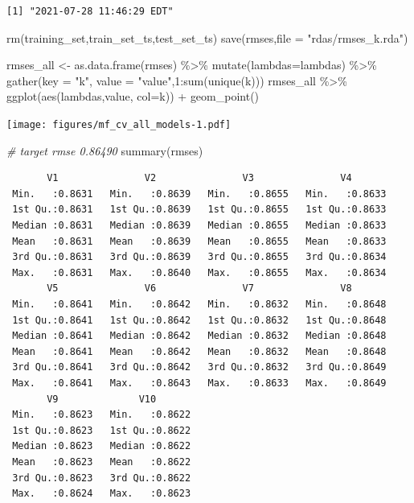 \documentclass[
]{article}
\newenvironment{Shaded}{}{}
\newcommand{\AttributeTok}[1]{\textcolor[rgb]{0.49,0.56,0.16}{#1}}
\newcommand{\CommentTok}[1]{\textcolor[rgb]{0.38,0.63,0.69}{\textit{#1}}}
\newcommand{\DecValTok}[1]{\textcolor[rgb]{0.25,0.63,0.44}{#1}}
\newcommand{\FunctionTok}[1]{\textcolor[rgb]{0.02,0.16,0.49}{#1}}
\newcommand{\NormalTok}[1]{#1}
\newcommand{\OtherTok}[1]{\textcolor[rgb]{0.00,0.44,0.13}{#1}}
\newcommand{\SpecialCharTok}[1]{\textcolor[rgb]{0.25,0.44,0.63}{#1}}
\newcommand{\StringTok}[1]{\textcolor[rgb]{0.25,0.44,0.63}{#1}}
\begin{document}
\begin{verbatim}
[1] "2021-07-28 11:46:29 EDT"
\end{verbatim}

\begin{Shaded}
\begin{Highlighting}[]
\FunctionTok{rm}\NormalTok{(training\_set,train\_set\_ts,test\_set\_ts)}
\FunctionTok{save}\NormalTok{(rmses,}\AttributeTok{file =} \StringTok{"rdas/rmses\_k.rda"}\NormalTok{)}

\NormalTok{rmses\_all }\OtherTok{\textless{}{-}} \FunctionTok{as.data.frame}\NormalTok{(rmses) }\SpecialCharTok{\%\textgreater{}\%} 
  \FunctionTok{mutate}\NormalTok{(}\AttributeTok{lambdas=}\NormalTok{lambdas) }\SpecialCharTok{\%\textgreater{}\%} 
  \FunctionTok{gather}\NormalTok{(}\AttributeTok{key =} \StringTok{"k"}\NormalTok{, }\AttributeTok{value =} \StringTok{"value"}\NormalTok{,}\DecValTok{1}\SpecialCharTok{:}\FunctionTok{sum}\NormalTok{(}\FunctionTok{unique}\NormalTok{(k))) }
\NormalTok{rmses\_all }\SpecialCharTok{\%\textgreater{}\%} 
  \FunctionTok{ggplot}\NormalTok{(}\FunctionTok{aes}\NormalTok{(lambdas,value, }\AttributeTok{col=}\NormalTok{k)) }\SpecialCharTok{+} 
  \FunctionTok{geom\_point}\NormalTok{()}
\end{Highlighting}
\end{Shaded}

\texttt{[image: figures/mf\_cv\_all\_models-1.pdf]}

\begin{Shaded}
\begin{Highlighting}[]
\CommentTok{\# target rmse 0.86490}
\FunctionTok{summary}\NormalTok{(rmses)}
\end{Highlighting}
\end{Shaded}

\begin{verbatim}
       V1               V2               V3               V4        
 Min.   :0.8631   Min.   :0.8639   Min.   :0.8655   Min.   :0.8633  
 1st Qu.:0.8631   1st Qu.:0.8639   1st Qu.:0.8655   1st Qu.:0.8633  
 Median :0.8631   Median :0.8639   Median :0.8655   Median :0.8633  
 Mean   :0.8631   Mean   :0.8639   Mean   :0.8655   Mean   :0.8633  
 3rd Qu.:0.8631   3rd Qu.:0.8639   3rd Qu.:0.8655   3rd Qu.:0.8634  
 Max.   :0.8631   Max.   :0.8640   Max.   :0.8655   Max.   :0.8634  
       V5               V6               V7               V8        
 Min.   :0.8641   Min.   :0.8642   Min.   :0.8632   Min.   :0.8648  
 1st Qu.:0.8641   1st Qu.:0.8642   1st Qu.:0.8632   1st Qu.:0.8648  
 Median :0.8641   Median :0.8642   Median :0.8632   Median :0.8648  
 Mean   :0.8641   Mean   :0.8642   Mean   :0.8632   Mean   :0.8648  
 3rd Qu.:0.8641   3rd Qu.:0.8642   3rd Qu.:0.8632   3rd Qu.:0.8649  
 Max.   :0.8641   Max.   :0.8643   Max.   :0.8633   Max.   :0.8649  
       V9              V10        
 Min.   :0.8623   Min.   :0.8622  
 1st Qu.:0.8623   1st Qu.:0.8622  
 Median :0.8623   Median :0.8622  
 Mean   :0.8623   Mean   :0.8622  
 3rd Qu.:0.8623   3rd Qu.:0.8622  
 Max.   :0.8624   Max.   :0.8623  
\end{verbatim}
\end{document}
